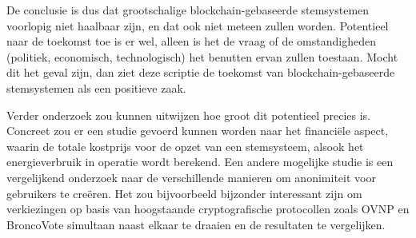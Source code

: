 De conclusie is dus dat grootschalige blockchain-gebaseerde stemsystemen voorlopig niet haalbaar zijn, en dat ook niet meteen zullen worden. Potentieel naar de toekomst toe is er wel, alleen is het de vraag of de omstandigheden  (politiek, economisch, technologisch) het benutten ervan zullen toestaan. Mocht dit het geval zijn, dan ziet deze scriptie de toekomst van blockchain-gebaseerde stemsystemen als een positieve zaak.
	
Verder onderzoek zou kunnen uitwijzen hoe groot dit potentieel precies is. Concreet zou er een studie gevoerd kunnen worden naar het financiële aspect, waarin de totale kostprijs voor de opzet van een stemsysteem, alsook het energieverbruik in operatie wordt berekend. Een andere mogelijke studie is een vergelijkend onderzoek naar de verschillende manieren om anonimiteit  voor gebruikers te creëren. Het zou bijvoorbeeld bijzonder interessant zijn om verkiezingen op basis van hoogstaande cryptografische protocollen zoals OVNP en BroncoVote simultaan naast elkaar te draaien en de resultaten te vergelijken.
	


